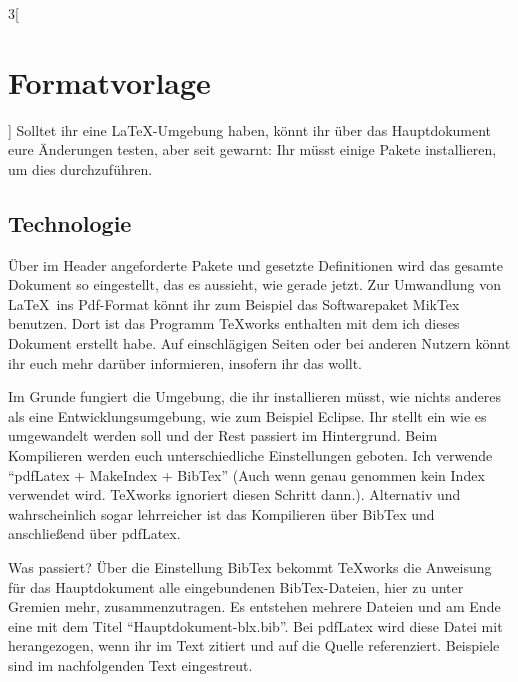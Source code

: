\begin{multicols}{3}[\section{Formatvorlage}]
Solltet ihr eine \LaTeX-Umgebung haben, könnt ihr über das Hauptdokument eure Änderungen testen, aber seit gewarnt: Ihr müsst einige Pakete installieren, um dies durchzuführen.

\subsection*{Technologie}
Über im Header angeforderte Pakete und gesetzte Definitionen wird das gesamte Dokument so eingestellt, das es aussieht, wie gerade jetzt. Zur Umwandlung von \LaTeX~ins Pdf-Format könnt ihr zum Beispiel das Softwarepaket MikTex benutzen. Dort ist das Programm TeXworks enthalten mit dem ich dieses Dokument erstellt habe. Auf einschlägigen Seiten oder bei anderen Nutzern könnt ihr euch mehr darüber informieren, insofern ihr das wollt. 

Im Grunde fungiert die Umgebung, die ihr installieren müsst, wie nichts anderes als eine Entwicklungsumgebung, wie zum Beispiel Eclipse. Ihr stellt ein wie es umgewandelt werden soll und der Rest passiert im Hintergrund. Beim Kompilieren werden euch unterschiedliche Einstellungen geboten. Ich verwende \enquote{pdfLatex + MakeIndex + BibTex} (Auch wenn genau genommen kein Index verwendet wird. TeXworks ignoriert diesen Schritt dann.). Alternativ und wahrscheinlich sogar lehrreicher ist das Kompilieren über BibTex und anschließend über pdfLatex. 

Was passiert? Über die Einstellung BibTex bekommt TeXworks die Anweisung für das Hauptdokument alle eingebundenen BibTex-Dateien, hier zu unter Gremien mehr, zusammenzutragen. Es entstehen mehrere Dateien und am Ende eine mit dem Titel \enquote{Hauptdokument-blx.bib}. Bei pdfLatex wird diese Datei mit herangezogen, wenn ihr im Text zitiert und auf die Quelle referenziert. Beispiele sind im nachfolgenden Text eingestreut. 


\end{multicols}
